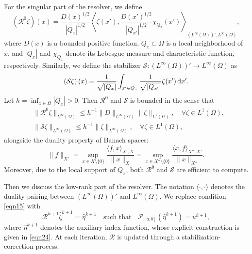 \documentclass[onefignum,onetabnum]{siamart190516}
\numberwithin{equation}{section}
\begin{document}
For the singular part of the resolver, we define
\begin{equation}\label{eqn18}
\left(\mathcal{R}^{0}\zeta\right)(x) = \frac{D(x)^{1/2}}{|Q_{x}|^{1/2}}\left\langle \zeta(x'), \frac{D(x')^{1/2}}{|Q_{x'}|^{1/2}}\chi_{Q_{x}}(x') \right\rangle_{(L^{\infty}(\Omega))',L^{\infty}(\Omega)},
\end{equation}
where $D(x)$ is a bounded positive function, $Q_x \subset \Omega$ is a local neighborhood of $x$, and $|Q_x|$ and $\chi_{Q_x}$ denote its Lebesgue measure and characteristic function, respectively.
Similarly, we define the stabilizer $\mathcal{S} : (L^\infty(\Omega))' \to L^\infty(\Omega)$ as  
\begin{equation*}
\left(\mathcal{S}\zeta\right)(x) = \frac{1}{\sqrt{|Q_{x}|}}\int_{x'\in Q_{x}} \frac{1}{\sqrt{|Q_{x'}|}}\zeta(x') \, {\rm d}x'.
\end{equation*}
Let $h = \inf_{x \in \Omega} |Q_x|>0$.
Then $\mathcal{R}^0$ and $\mathcal{S}$ is bounded in the sense that  
\begin{equation}\label{eqn20}
\begin{aligned}
{}&\|\mathcal{R}^{0}\zeta\|_{L^{\infty}(\Omega)} \leq h^{-1}\|D\|_{L^{\infty}(\Omega)} \|\zeta\|_{L^{1}(\Omega)}, \quad \forall \zeta \in L^{1}(\Omega),\\
{}&\|\mathcal{S} \zeta\|_{L^\infty(\Omega)} \leq h^{-1} \|\zeta\|_{L^\infty(\Omega)}, \quad \forall \zeta \in L^{1}(\Omega),
\end{aligned}
\end{equation}
alongside the duality property of Banach spaces:
\begin{equation*}
\|f\|_{X'} = \sup_{x \in X \setminus \{0\}} \frac{\langle f, x \rangle_{X',X}}{\|x\|_{X}} = \sup_{x \in X'' \setminus \{0\}} \frac{\langle x, f \rangle_{X'',X'}}{\|x\|_{X''}}.
\end{equation*}
Moreover, due to the local support of $Q_x$, both $\mathcal{R}^0$ and $\mathcal{S}$ are efficient to compute.

Then we discuss the low-rank part of the resolver.
The notation $\langle\cdot,\cdot\rangle$ denotes the duality pairing between $(L^{\infty}(\Omega))'$ and $L^{\infty}(\Omega)$.
We replace condition \eqref{eqn15} with
\begin{equation*}
\mathcal{R}^{k+1}\hat{\zeta}^{k+1} = \hat{\eta}^{k+1} \quad \text{such that} \quad \mathcal{P}_{[a,b]}(\hat{\eta}^{k+1}) = u^{k+1},
\end{equation*}
where $\hat{\eta}^{k+1}$ denotes the auxiliary index function, whose explicit construction is given in \eqref{eqn24}.
At each iteration, $\mathcal{R}$ is updated through a stabilization-correction process.
\end{document}
